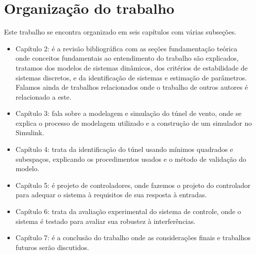 \section{Organização do trabalho}


Este trabalho se encontra organizado em seis capítulos com várias subseções. 
\begin{itemize}
	\item Capítulo 2: é a revisão bibliográfica com as seções fundamentação teórica onde conceitos fundamentais ao entendimento do trabalho são explicados, tratamos dos modelos de sistemas dinâmicos, dos critérios de estabilidade de sistemas discretos, e da identificação de sistemas e estimação de parâmetros. Falamos ainda de trabalhos relacionados onde o trabalho de outros autores é relacionado a este.
	\item Capítulo 3: fala sobre a modelagem e simulação do túnel de vento, onde se explica o processo de modelagem utilizado e a construção de um simulador no Simulink.
	\item Capítulo 4: trata da identificação do túnel usando mínimos quadrados e subespaços, explicando os procedimentos usados e o método de validação do modelo.
	\item Capítulo 5: é projeto de controladores, onde fazemos o projeto do controlador para adequar o sistema à requisitos de sua resposta à entradas.
	\item Capítulo 6: trata da avaliação experimental do sistema de controle, onde o sistema é testado para avaliar sua robustez à interferências.
	\item Capítulo 7: é a conclusão do trabalho onde as considerações finais e trabalhos futuros serão discutidos.
\end{itemize}     

